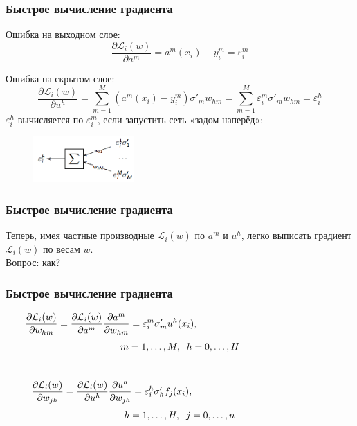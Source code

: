 \documentclass[10pt]{beamer}
\begin{document}
\begin{frame}\frametitle{Быстрое вычисление градиента}
  Ошибка на выходном слое:	
	$$\frac{\partial \mathcal{L}_i(w)}{\partial a^m} = a^m (x_i) - y_i^m = \varepsilon^m_i$$ 
	
	Ошибка на скрытом слое:	
	$$\frac{\partial \mathcal{L}_i(w)}{\partial u^h} = \sum\limits_{m=1}^M (a^m(x_i) - y_i^m) \sigma'_m w_{hm} = \sum\limits_{m=1}^M \varepsilon^m_i \sigma'_m w_{hm} = \varepsilon^h_i$$
	$\varepsilon_i^h$ вычисляется по $\varepsilon_i^m$, если запустить сеть «задом наперёд»:\\
	
	\begin{figure}[htbp]
	  \includegraphics[height=50pt, keepaspectratio = true]{images/backpropagation}   
	\end{figure}

\end{frame}

\begin{frame}\frametitle{Быстрое вычисление градиента}
	Теперь, имея частные производные $\mathcal{L}_i(w)$ по $a^m$ и $u^h$, легко выписать градиент $\mathcal{L}_i(w)$ по весам $w$.\\
	\bigbreak
	\pause
	\alert{Вопрос}: как?
\end{frame}

\begin{frame}\frametitle{Быстрое вычисление градиента}
	$$\frac {\partial \mathcal{L}_i(w)}{\partial w_{hm}} = \frac {\partial \mathcal{L}_i(w)}{\partial a^m} \frac {\partial a^m}{\partial w_{hm}} = \varepsilon^m_i \sigma'_m u^h(x_i), \hspace{50mm}$$ $$m = 1,\dots,M, \hspace{2mm} h = 0,\dots, H$$\\
	
	$$\frac {\partial \mathcal{L}_i(w)}{\partial w_{jh}} = \frac {\partial \mathcal{L}_i(w)}{\partial u^h} \frac {\partial u^h}{\partial w_{jh}} = \varepsilon_i^h \sigma'_h f_j(x_i), \hspace{50mm}$$ $$h = 1,\dots,H, \hspace{2mm} j = 0,\dots, n$$ \\
\end{frame}
\end{document}
